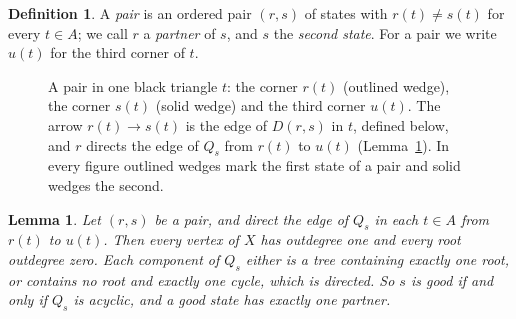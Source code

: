 \documentclass[10pt]{amsart}
\numberwithin{equation}{section}
\newtheorem{lemma}[equation]{Lemma}
\theoremstyle{definition}
\newtheorem{definition}[equation]{Definition}
\theoremstyle{remark}
\begin{document}
\begin{definition}
A \emph{pair} is an ordered pair $(r,s)$ of states with $r(t)\neq s(t)$ for every $t\in A$; we call $r$ a \emph{partner} of $s$, and $s$ the \emph{second state}.
For a pair we write $u(t)$ for the third corner of $t$.
\end{definition}

\begin{figure}[!htb]
\centering
{}
\caption{A pair in one black triangle $t$: the corner $r(t)$ (outlined wedge), the corner $s(t)$ (solid wedge) and the third corner $u(t)$. The arrow $r(t)\to s(t)$ is the edge of $D(r,s)$ in $t$, defined below, and $r$ directs the edge of $Q_s$ from $r(t)$ to $u(t)$ (Lemma~\ref{lem:partner}). In every figure outlined wedges mark the first state of a pair and solid wedges the second.}
\label{fig:localpair}
\end{figure}

\begin{lemma}\label{lem:partner}
Let $(r,s)$ be a pair, and direct the edge of $Q_s$ in each $t\in A$ from $r(t)$ to $u(t)$.
Then every vertex of $X$ has outdegree one and every root outdegree zero.
Each component of $Q_s$ either is a tree containing exactly one root, or contains no root and exactly one cycle, which is directed.
So $s$ is good if and only if $Q_s$ is acyclic, and a good state has exactly one partner.
\end{lemma}
\end{document}
